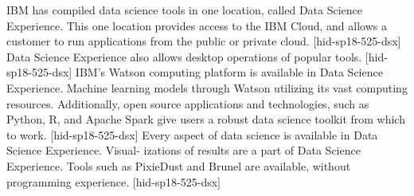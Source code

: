 
IBM has compiled data science tools in one location, 
called Data Science Experience. This one location provides
access to the IBM Cloud, and allows a customer to run 
applications from the public or private cloud. 
[hid-sp18-525-dsx]
Data Science Experience also allows desktop operations 
of popular tools. [hid-sp18-525-dsx]
IBM’s Watson computing platform is available in Data Science
Experience. Machine learning models through Watson utilizing
its vast computing resources. Additionally, open source 
applications and technologies, such as Python, R, and Apache 
Spark give users a robust data science toolkit from which to
work. [hid-sp18-525-dsx]
Every aspect of data science is available in Data Science 
Experience. Visual- izations of results are a part of Data 
Science Experience. Tools such as PixieDust and Brunel are 
available, without programming experience. [hid-sp18-525-dsx]
